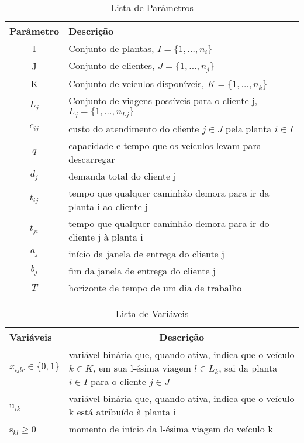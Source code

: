 \begin{table}[ht!]
  \centering
  \begin{tabular}{cl}
  \toprule
  \textbf{Parâmetro} & \textbf{Descrição} \\
  \hline
  I & Conjunto de plantas, $I=\{1,\ldots,n_i\}$\\
  J & Conjunto de clientes, $J = \{1,\ldots,n_j\}$ \\
  K & Conjunto de veículos disponíveis, $K=\{1,\ldots,n_k\}$\\
  $L_j$ & Conjunto de viagens possíveis para o cliente j, $L_j=\{1,\ldots,n_{Lj}\}$\\
  $c_{ij}$ & custo do atendimento do cliente $j\in J$ pela planta $i\in I$ \\
  $q$ & capacidade e tempo que os veículos levam para descarregar \\
  $d_{j}$ & demanda total do cliente j \\
  $t_{ij}$ & tempo que qualquer caminhão demora para ir da planta i ao cliente j \\
  $t_{ji}$ & tempo que qualquer caminhão demora para ir do cliente j à planta i \\
  $a_{j}$ & início da janela de entrega do cliente j \\
  $b_{j}$ & fim da janela de entrega do cliente j\\
  $T$ & horizonte de tempo de um dia de trabalho \\
  \hline
  \end{tabular}
  \caption{Lista de Parâmetros}
  \label{tab:parametros}
\end{table}


\begin{table}[ht!]
  \centering
  \begin{tabular}{p{3cm}p{10cm}}
  \toprule
  \textbf{Variáveis} & \multicolumn{1}{c}{\textbf{Descrição}} \\
  \midrule
  $x_{ijlr}\in \{0,1\}$ & variável binária que, quando ativa, indica que o veículo $k \in K$, em sua l-é\-si\-ma via\-gem $l\in L_k$, sai
  da planta $i\in I$ para o cliente $j\in J$ \\
  u$_{ik}$ & variável binária que, quando ativa, indica que o veículo k está atribuído à planta i \\
  s$_{kl}\geq 0$ & momento de início da l-ésima viagem do veículo k \\
  \bottomrule
  \end{tabular}
  \caption{Lista de Variáveis}
  \label{tab:variables}
\end{table}


